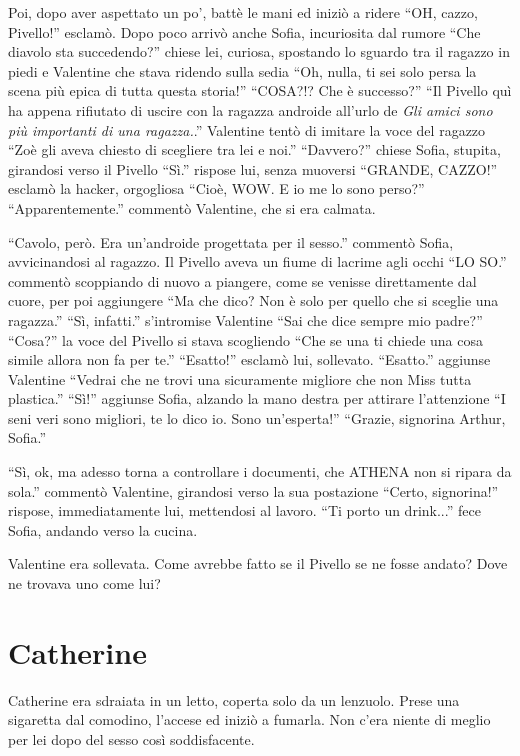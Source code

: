     Poi, dopo aver aspettato un po', battè le mani ed iniziò a ridere ``OH, cazzo, Pivello!'' esclamò. Dopo poco arrivò
    anche Sofia, incuriosita dal rumore ``Che diavolo sta succedendo?'' chiese lei, curiosa, spostando lo sguardo tra il
    ragazzo in piedi e Valentine che stava ridendo sulla sedia ``Oh, nulla, ti sei solo persa la scena più epica di
    tutta questa storia!'' ``COSA?!? Che è successo?'' ``Il Pivello quì ha appena rifiutato di uscire con la ragazza
    androide all'urlo de \emph{Gli amici sono più importanti di una ragazza.}.'' Valentine tentò di imitare la voce del
    ragazzo ``Zoè gli aveva chiesto di scegliere tra lei e noi.'' ``Davvero?'' chiese Sofia, stupita, girandosi verso il
    Pivello ``Sì.'' rispose lui, senza muoversi ``GRANDE, CAZZO!'' esclamò la hacker, orgogliosa ``Cioè, WOW. E io me lo
    sono perso?'' ``Apparentemente.'' commentò Valentine, che si era calmata.

    ``Cavolo, però. Era un'androide progettata per il sesso.'' commentò Sofia, avvicinandosi al ragazzo. Il Pivello
    aveva un fiume di lacrime agli occhi ``LO SO.'' commentò scoppiando di nuovo a piangere, come se venisse direttamente dal cuore, per poi aggiungere
    ``Ma che dico? Non è solo per quello che si sceglie una ragazza.'' ``Sì, infatti.'' s'intromise  Valentine ``Sai che
    dice sempre mio padre?'' ``Cosa?'' la voce del Pivello si stava scogliendo ``Che se una ti chiede una cosa simile
    allora non fa per te.'' ``Esatto!'' esclamò lui, sollevato. ``Esatto.'' aggiunse Valentine ``Vedrai che ne trovi una
    sicuramente migliore che non Miss tutta plastica.'' ``Sì!'' aggiunse Sofia, alzando la mano destra per attirare
    l'attenzione ``I seni veri sono migliori, te lo dico io. Sono un'esperta!'' ``Grazie, signorina Arthur, Sofia.''

    ``Sì, ok, ma adesso torna a controllare i documenti, che ATHENA non si ripara da sola.'' commentò Valentine,
    girandosi verso la sua postazione ``Certo, signorina!'' rispose, immediatamente lui, mettendosi al lavoro. ``Ti
    porto un drink...'' fece Sofia, andando verso la cucina.

    Valentine era sollevata. Come avrebbe fatto se il Pivello se ne fosse andato? Dove ne trovava uno come lui?

  \section*{Catherine}

    Catherine era sdraiata in un letto, coperta solo da un lenzuolo. Prese una sigaretta dal comodino, l'accese ed
    iniziò a fumarla. Non c'era niente di meglio per lei dopo del sesso così soddisfacente.

